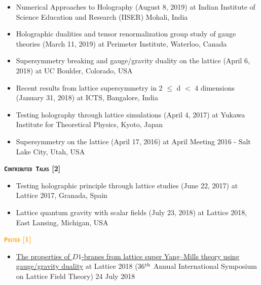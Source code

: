 \begin{itemize}
 \href{https://rgjha.github.io/talks/Talk_v1.pdf}{{\texttt{}}} 
 \item Numerical Approaches to Holography (August 8, 2019) at Indian Institute of Science Education and Research (IISER) Mohali, India
  \item Holographic dualities and tensor renormalization group study of gauge theories (March 11, 2019) at Perimeter Institute, Waterloo, Canada 
  \href{http://www.perimeterinstitute.ca/videos/interdisciplinary-seminar-holographic-dualities-and-tensor-renormalization-group-study-gauge}
{{\texttt{}}} 
  \item Supersymmetry breaking and gauge/gravity duality on the lattice (April 6, 2018) at UC Boulder, Colorado, USA \href{https://rgjha.github.io/talks/lbsm18_jha.pdf}{{\texttt{}}} 
  \item Recent results from lattice supersymmetry in 2 $\le$ d $<$ 4 dimensions (January 31, 2018) at ICTS, Bangalore, India \href{https://www.youtube.com/watch?v=Zey6DAEiw0c}{{\texttt{}}} 
 \item Testing holography through lattice simulations (April 4, 2017) at Yukawa Institute for Theoretical Physics, Kyoto, Japan
 \href{https://rgjha.github.io/talks/kyoto_v1.pdf}{{\texttt{\COL{[PDF]}}}}
\item Supersymmetry on the lattice (April 17, 2016) at April Meeting 2016 - Salt Lake City, Utah, USA
\href{https://rgjha.github.io/talks/aps_april.pdf}{{\texttt{}}} 
\end{itemize}

\textcolor{bittersweet}{\textbf{\textsc{\fontsize{12}{48} \bfseries \texttt{Contributed Talks} [2]}}}
\begin{itemize}
  \item Testing holographic principle through lattice studies (June 22, 2017) at Lattice 2017, Granada, Spain
  \item Lattice quantum gravity with scalar fields (July 23, 2018) at Lattice 2018, East Lansing, Michigan, USA   
\end{itemize}
 

\textcolor{orange}{\textbf{\textsc{\fontsize{12}{48} \bfseries \texttt{Poster} [1]}}}
  \begin{itemize}
 \item \href{https://indico.fnal.gov/event/15949/session/4/contribution/66}{The properties of $D1$-branes from lattice super Yang--Mills theory using gauge/gravity duality} at Lattice 2018 (36$^{\rm{th}}$ Annual International Symposium on Lattice Field Theory) \hfill 24 July 2018
\end{itemize}
